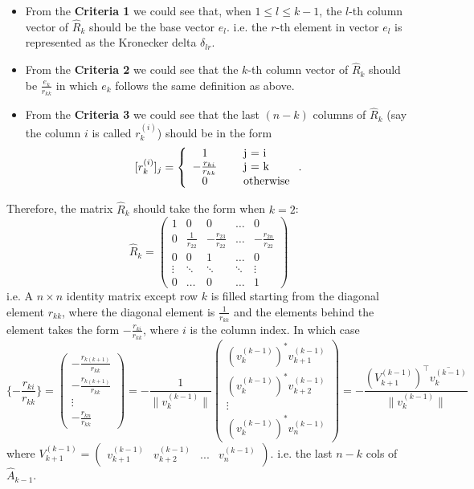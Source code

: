 \begin{itemize}
  \item From the \textbf{Criteria 1} we could see that, when $1 \le  l \le  k - 1$, the $l$-th column vector of $\hat{R}_{k}$ should be the base vector $e_{l}$. i.e. the $r$-th element in vector $e_l$ is represented as the Kronecker delta $\delta_{lr}$.
  \item From the \textbf{Criteria 2} we could see that the $k$-th column vector of $ \hat{R}_{k}$ should be $\frac{e_k}{r_{kk}}$ in which $e_k$ follows the same definition as above.
  \item From the  \textbf{Criteria 3} we could see that the last $(n - k)$ columns of $\hat{R}_{k}$ (say the column $i$ is called $r_{k}^{(i)}$) should be in the form
    \[
      [r_{k}^{(i)}]_j = \left\{
        \begin{array}{ccl}
          1 &~ & $j = i$ \\
          -\frac{r_{ki}}{r_{kk}} & ~&$j = k$ \\
          0 & ~&\text{otherwise}
        \end{array}
      \right.
    .\] 
\end{itemize}
Therefore, the matrix $\hat{R}_{k}$ should take the form when $k = 2$:
\[
  \hat{R}_{k} = \begin{pmatrix}
  1 & 0 & 0 & \ldots & 0 \\
  0 & \frac{1}{r_{22}} & -\frac{r_{23}}{r_{22}} & \ldots & -\frac{r_{2n}}{r_{22}} \\
  0 & 0 & 1 & \ldots & 0 \\
  \vdots & \ddots & \ddots & \ddots & \vdots \\
  0 & \ldots & 0 & \ldots & 1
\end{pmatrix} 
\]
i.e. A $n \times n$ identity matrix except row $k$ is filled starting from the diagonal element $r_{kk}$, where the diagonal element is $\frac{1}{r_{kk}}$ and the elements behind the element takes the form $-\frac{r_{ki}}{r_{kk}}$, where $i$ is the column index. In which case
\[
  \{-\frac{r_{ki}}{r_{kk}}\} = \begin{pmatrix} 
    - \frac{r_{k(k + 1)}}{r_{kk}} \\ -\frac{r_{k(k + 1)}}{r_{kk}} \\ \vdots \\ -\frac{r_{kn}}{r_{kk}}
  \end{pmatrix} = -\frac{1}{\|v_{k}^{(k - 1)}\|}\begin{pmatrix} 
    (v_k^{(k - 1)})^{*}v_{k + 1}^{(k - 1)} \\
    (v_k^{(k - 1)})^{*}v_{k + 2}^{(k - 1)} \\
    \vdots \\
    (v_k^{(k - 1)})^{*}v_{n}^{(k - 1)}
  \end{pmatrix} = -\frac{(V_{k + 1}^{(k - 1)})^{\top}\overline{v_k^{(k - 1)}}}{\|v_{k}^{(k - 1)}\|}
\]
where \(V_{k + 1}^{(k - 1)} = \begin{pmatrix} 
  v_{k + 1}^{(k - 1)} & v_{k + 2}^{(k - 1)} & ... & v_{n}^{(k - 1)}
\end{pmatrix} \). i.e. the last \(n - k\) cols of \(\hat{A}_{k - 1}\).  \medskip

